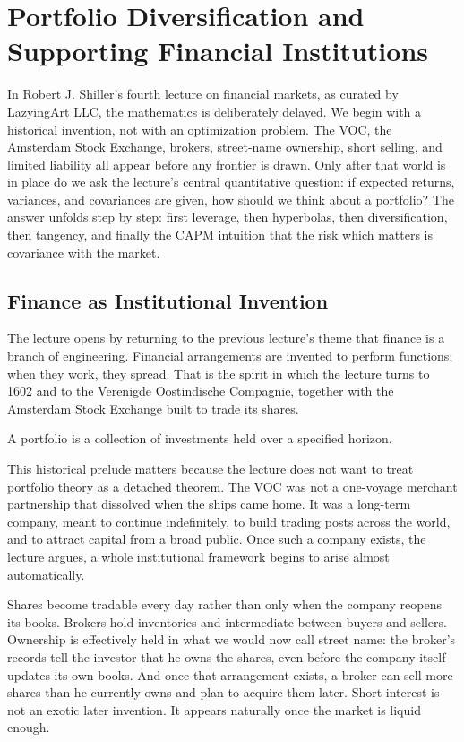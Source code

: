 \chapter{Portfolio Diversification and Supporting Financial Institutions}

In Robert J. Shiller's fourth lecture on financial markets, as curated by LazyingArt LLC, the mathematics is deliberately delayed. We begin with a historical invention, not with an optimization problem. The VOC, the Amsterdam Stock Exchange, brokers, street-name ownership, short selling, and limited liability all appear before any frontier is drawn. Only after that world is in place do we ask the lecture's central quantitative question: if expected returns, variances, and covariances are given, how should we think about a portfolio? The answer unfolds step by step: first leverage, then hyperbolas, then diversification, then tangency, and finally the CAPM intuition that the risk which matters is covariance with the market.

\section{Finance as Institutional Invention}

The lecture opens by returning to the previous lecture's theme that finance is a branch of engineering. Financial arrangements are invented to perform functions; when they work, they spread. That is the spirit in which the lecture turns to 1602 and to the Verenigde Oostindische Compagnie, together with the Amsterdam Stock Exchange built to trade its shares.

\begin{definition}
A portfolio is a collection of investments held over a specified horizon.
\end{definition}

This historical prelude matters because the lecture does not want to treat portfolio theory as a detached theorem. The VOC was not a one-voyage merchant partnership that dissolved when the ships came home. It was a long-term company, meant to continue indefinitely, to build trading posts across the world, and to attract capital from a broad public. Once such a company exists, the lecture argues, a whole institutional framework begins to arise almost automatically.

Shares become tradable every day rather than only when the company reopens its books. Brokers hold inventories and intermediate between buyers and sellers. Ownership is effectively held in what we would now call street name: the broker's records tell the investor that he owns the shares, even before the company itself updates its own books. And once that arrangement exists, a broker can sell more shares than he currently owns and plan to acquire them later. Short interest is not an exotic later invention. It appears naturally once the market is liquid enough.

